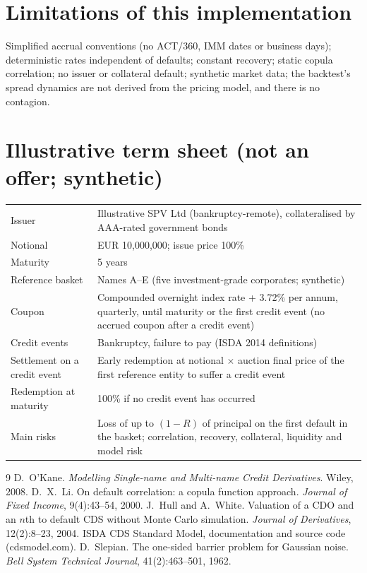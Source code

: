 \documentclass[11pt,a4paper]{article}
\begin{document}
\section{Limitations of this implementation}
Simplified accrual conventions (no ACT/360, IMM dates or business days); deterministic rates independent
of defaults; constant recovery; static copula correlation; no issuer or collateral default; synthetic
market data; the backtest's spread dynamics are not derived from the pricing model, and there is no contagion.

\appendix
\section{Illustrative term sheet (not an offer; synthetic)}
\begin{center}\small
\begin{tabular}{p{}p{}}\toprule
Issuer & Illustrative SPV Ltd (bankruptcy-remote), collateralised by AAA-rated government bonds\\
Notional & EUR 10,000,000; issue price 100\%\\
Maturity & 5 years\\
Reference basket & Names A--E (five investment-grade corporates; synthetic)\\
Coupon & Compounded overnight index rate + 3.72\% per annum, quarterly, until maturity or the first
credit event (no accrued coupon after a credit event)\\
Credit events & Bankruptcy, failure to pay (ISDA 2014 definitions)\\
Settlement on a credit event & Early redemption at notional $\times$ auction final price of the first
reference entity to suffer a credit event\\
Redemption at maturity & 100\% if no credit event has occurred\\
Main risks & Loss of up to $(1-R)$ of principal on the first default in the basket; correlation, recovery,
collateral, liquidity and model risk\\\bottomrule
\end{tabular}
\end{center}

\begin{thebibliography}{9}
 D.~O'Kane. \emph{Modelling Single-name and Multi-name Credit Derivatives}. Wiley, 2008.
 D.~X.~Li. On default correlation: a copula function approach. \emph{Journal of Fixed
Income}, 9(4):43--54, 2000.
 J.~Hull and A.~White. Valuation of a CDO and an $n$th to default CDS without Monte
Carlo simulation. \emph{Journal of Derivatives}, 12(2):8--23, 2004.
 ISDA CDS Standard Model, documentation and source code (cdsmodel.com).
 D.~Slepian. The one-sided barrier problem for Gaussian noise. \emph{Bell System
Technical Journal}, 41(2):463--501, 1962.
\end{thebibliography}
\end{document}
